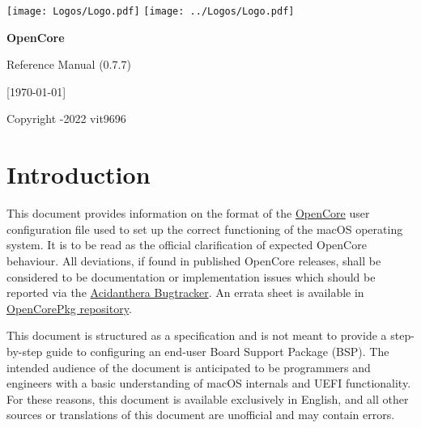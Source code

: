 \documentclass[]{article}
\begin{document}
\begin{titlepage}
   \begin{center}
       \vspace*{2.0in}

       \Huge

         {\texttt{[image: Logos/Logo.pdf]}}
         {\texttt{[image: ../Logos/Logo.pdf]}}

       \sffamily

       \textbf{OpenCore}

       \vspace{0.2in}

       Reference Manual (0.7.7)

       \vspace{0.2in}

        {[}\today{]}

       \normalsize

       \vfill

       \rmfamily

       Copyright -2022 vit9696

   \end{center}
\end{titlepage}

\tableofcontents

\section{Introduction}\label{introduction}

This document provides information on the format of the
\href{https://github.com/acidanthera/OpenCorePkg}{OpenCore} user
configuration file used to set up the correct functioning of the macOS
operating system. It is to be read as the official clarification of expected
OpenCore behaviour. All deviations, if found in published OpenCore releases,
shall be considered to be documentation or implementation issues which should be
reported via the \href{https://github.com/acidanthera/bugtracker}{Acidanthera Bugtracker}.
An errata sheet is available in
\href{https://github.com/acidanthera/OpenCorePkg/blob/master/Docs/Errata/Errata.pdf}{OpenCorePkg repository}.

This document is structured as a specification and is not meant to provide a step-by-step
guide to configuring an end-user Board Support Package (BSP). The intended audience
of the document is anticipated to be programmers and engineers with a basic understanding of macOS internals
and UEFI functionality. For these reasons, this document is available exclusively in English,
and all other sources or translations of this document are unofficial and may
contain errors.
\end{document}
